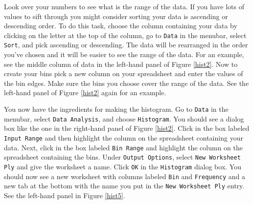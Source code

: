 Look over your numbers to see what is the range of the data.
If you have lots of values to sift through you might consider sorting your data is ascending or descending order.
To do this task, choose the column containing your data by clicking on the letter at the top of the column, 
go to {\tt Data} in the menubar, select {\tt Sort}, and pick
ascending or descending.
The data will be rearranged in the order you've chosen and it will be easier to see the range of the data.
For an example, see the middle column of data in the left-hand panel of Figure \ref{hist2}.
Now to create your bins pick a new column on your spreadsheet and enter the values of the bin edges.
Make sure the bins you choose cover the range of the data. 
See the left-hand panel of Figure \ref{hist2} again for an example.

You now have the ingredients for making the histogram.
Go to {\tt Data} in the menubar, select {\tt Data Analysis}, and choose {\tt Histogram}.
You should see a dialog box like the one in the right-hand panel of  Figure \ref{hist2}.
Click in the box labeled {\tt Input Range} and then highlight the column on the spreadsheet containing your data.
Next, click in the box labeled {\tt Bin Range} and highlight the column on the spreadsheet containing the bins.
Under {\tt Output Options}, select {\tt New Worksheet Ply} and give the worksheet a name.
Click {\tt OK} in the {\tt Histogram} dialog box.
You should now see a new worksheet with columns labeled {\tt Bin} and {\tt Frequency} and a new tab at the bottom with the name you put in
the {\tt New Worksheet Ply} entry.
See the left-hand panel in Figure \ref{hist5}.
